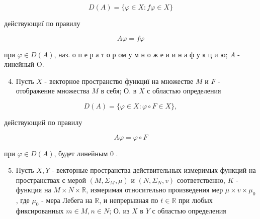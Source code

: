 \documentclass[10pt]{article}
\begin{document}
\[

D(A)=\{\varphi \in X: f \varphi \in X\}

\]



действующиї по правилу



\[

A \varphi=f \varphi

\]



при $\varphi \in D(A)$, наз. о п е р а т о р ом у м н о ж е и и н а ф у к ц и ю; $A$ - линейный $\mathrm{O}$.



\begin{enumerate}

  \setcounter{enumi}{3}

  \item Пусть $X$ - векторное пространство функциї на множестве $M$ и $F$ - отображение множества $M$ в себя; О. в $X$ с областью определения

\end{enumerate}



\[

D(A)=\{\varphi \in X: \varphi \circ F \in X\},

\]



действующий по правилу



\[

A \varphi=\varphi \circ F

\]



при $\varphi \in D(A)$, будет линейным 0 .



\begin{enumerate}

  \setcounter{enumi}{4}

  \item Пусть $X, Y$ - векторные пространства действительных измеримых функций на пространствах с мерой $\left(M, \Sigma_{M}, \mu\right)$ и $\left(N, \Sigma_{N}, v\right)$ соответственно, $K$ - функция на $M \times N \times \mathbb{R}$, измеримая относительно произведения мер $\mu \times v \times \mu_{0}$, где $\mu_{0}$ - мера Лебега на $\mathbb{R}$, и непрерывная по $t \in \mathbb{R}$ при любых фиксированных $m \in M, n \in N$; О. из $X$ в $Y$ с областью определения

\end{enumerate}
\end{document}
